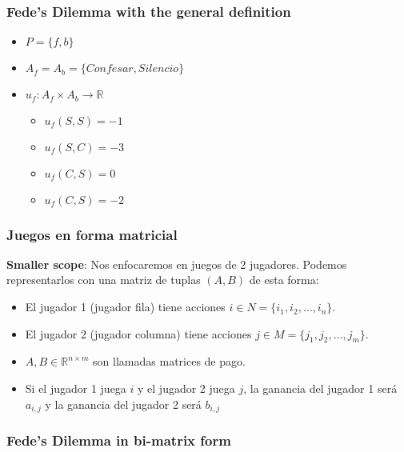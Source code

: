 \documentclass[pdf]{beamer}
\begin{document}
\begin{frame}
    \frametitle{Fede's Dilemma with the general definition}
    \begin{itemize}
        \item $P = \{f, b\}$
        \item \pause $A_f = A_b = \{Confesar, Silencio\}$
        \item \pause $u_f: A_f \times A_b \rightarrow \mathbb{R}$
        \begin{itemize}
            \item $u_f(S, S) = -1$
            \item $u_f(S, C) = -3$
            \item $u_f(C, S) = 0$
            \item $u_f(C, S) = -2$
        \end{itemize}
    \end{itemize}

\end{frame}

\begin{frame}
    \frametitle{Juegos en forma matricial}
        \textbf{Smaller scope}: Nos enfocaremos en juegos de 2 jugadores. Podemos representarlos con una matriz de tuplas $(A, B)$ de esta forma:

        

        \begin{itemize}
            \item El jugador 1 (jugador fila) tiene acciones $i \in N = \{i_1, i_2, \dots, i_n\}$.
            \pause
            \item El jugador 2 (jugador columna) tiene acciones $j \in M = \{j_1, j_2, \dots, j_m\}$.
            \pause
            \item $A, B \in \mathbb{R}^{n \times m}$ son llamadas matrices de pago.
            \pause
            \item Si el jugador 1 juega $i$ y el jugador 2 juega $j$, la ganancia del jugador 1 será $a_{i,j}$ y la ganancia del jugador 2 será $b_{i,j}$
        \end{itemize}
\end{frame}

\begin{frame}
    \frametitle{Fede's Dilemma in bi-matrix form}
    
\end{frame}
\end{document}
